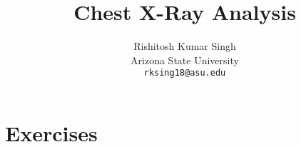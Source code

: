 \documentclass[10pt,twocolumn,letterpaper]{article}
\title{Chest X-Ray Analysis}
\author{Rishitosh Kumar Singh\\
Arizona State University\\
{\tt\small rksing18@asu.edu}
}
\begin{document}
\maketitle


    
    

\section{Exercises}
\label{sec:exercises}












{
    \small
    
    
}

% 
\end{document}
